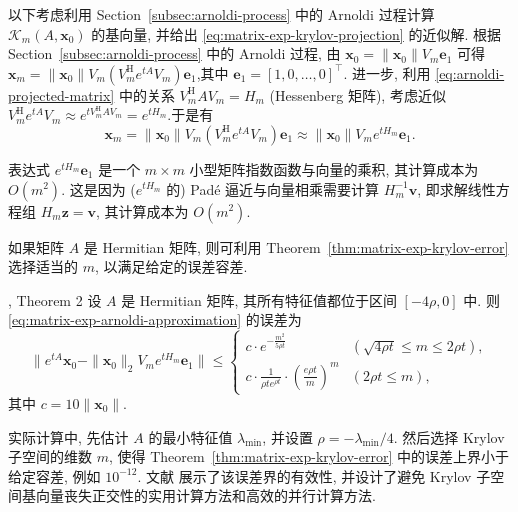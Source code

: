 {以下考虑利用 Section~\ref{subsec:arnoldi-process} 中的 Arnoldi 过程计算 $\mathcal{K}_m(A,\boldsymbol{x}_0)$ 的基向量, 并给出 \eqref{eq:matrix-exp-krylov-projection} 的近似解. 根据 Section~\ref{subsec:arnoldi-process} 中的 Arnoldi 过程, 由 $\boldsymbol{x}_0=\|\boldsymbol{x}_0\|V_m\boldsymbol{e}_1$ 可得\newline{}$\boldsymbol{x}_m=\|\boldsymbol{x}_0\|V_m(V_m^{\mathrm H}e^{tA}V_m)\boldsymbol{e}_1$,\newline{}其中 $\boldsymbol{e}_1=[1,0,\ldots,0]^{\top}$. 进一步, 利用 \eqref{eq:arnoldi-projected-matrix} 中的关系 $V_m^{\mathrm H}AV_m=H_m$ (Hessenberg 矩阵), 考虑近似\newline{}$V_m^{\mathrm H}e^{tA}V_m\approx e^{tV_m^{\mathrm H}AV_m}=e^{tH_m}$.\newline{}于是有}
\begin{equation}\label{eq:matrix-exp-arnoldi-approximation}\boldsymbol{x}_m=\|\boldsymbol{x}_0\|V_m(V_m^{\mathrm H}e^{tA}V_m)\boldsymbol{e}_1\approx\|\boldsymbol{x}_0\|V_me^{tH_m}\boldsymbol{e}_1.\end{equation}

{表达式 $e^{tH_m}\boldsymbol{e}_1$ 是一个 $m\times m$ 小型矩阵指数函数与向量的乘积, 其计算成本为 $O(m^2)$. 这是因为 ($e^{tH_m}$ 的) Padé 逼近与向量相乘需要计算 $H_m^{-1}\boldsymbol{v}$, 即求解线性方程组 $H_m\boldsymbol{z}=\boldsymbol{v}$, 其计算成本为 $O(m^2)$.}

{如果矩阵 $A$ 是 Hermitian 矩阵, 则可利用 Theorem~\ref{thm:matrix-exp-krylov-error} 选择适当的 $m$, 以满足给定的误差容差.}

\begin{Theorem}{, Theorem 2}\label{thm:matrix-exp-krylov-error}
{设 $A$ 是 Hermitian 矩阵, 其所有特征值都位于区间 $[-4\rho,0]$ 中. 则 \eqref{eq:matrix-exp-arnoldi-approximation} 的误差为}
\[\|e^{tA}\boldsymbol{x}_0-\|\boldsymbol{x}_0\|_2V_me^{tH_m}\boldsymbol{e}_1\|\le\begin{cases}c\cdot e^{-\frac{m^2}{5\rho t}}&(\sqrt{4\rho t}\le m\le2\rho t),\\c\cdot\frac{1}{\rho te^{\rho t}}\cdot\left(\frac{e\rho t}{m}\right)^m&(2\rho t\le m),\end{cases}\]
{其中 $c=10\|\boldsymbol{x}_0\|$.}
\end{Theorem}

{实际计算中, 先估计 $A$ 的最小特征值 $\lambda_{\min}$, 并设置 $\rho=-\lambda_{\min}/4$. 然后选择 Krylov 子空间的维数 $m$, 使得 Theorem~\ref{thm:matrix-exp-krylov-error} 中的误差上界小于给定容差, 例如 $10^{-12}$. 文献  展示了该误差界的有效性, 并设计了避免 Krylov 子空间基向量丧失正交性的实用计算方法和高效的并行计算方法.}
